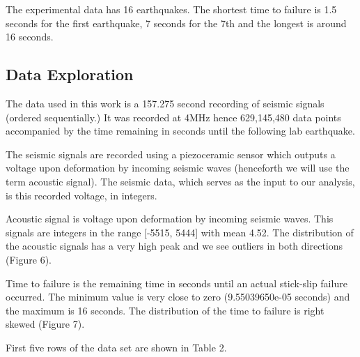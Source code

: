 \documentclass[]{llncs} %
\begin{document}
The experimental data has 16 earthquakes. The shortest time to failure is 1.5 seconds for the first earthquake, 7 seconds for the 7th and the longest is around 16 seconds. \par

\subsection{Data Exploration}
The data used in this work is a 157.275 second recording of seismic signals (ordered sequentially.) It was recorded at 4MHz hence 629,145,480 data points accompanied by the time remaining in seconds until the following lab earthquake. \par
The seismic signals are recorded using a piezoceramic sensor which outputs a voltage upon deformation by incoming seismic waves (henceforth we will use the term acoustic signal). The seismic data, which serves as the input to our analysis, is this recorded voltage, in integers. \par
Acoustic signal is voltage upon deformation by incoming seismic waves. This signals are integers in the range [-5515, 5444] with mean 4.52. The distribution of the acoustic signals has a very high peak and we see outliers in both directions (Figure 6). \par
Time to failure is the remaining time in seconds until an actual stick-slip failure occurred. The minimum value is very close to zero (9.55039650e-05 seconds) and the maximum is 16 seconds. The distribution of the time to failure is right skewed (Figure 7). \par
First five rows of the data set are shown in Table 2. \par
\end{document}
